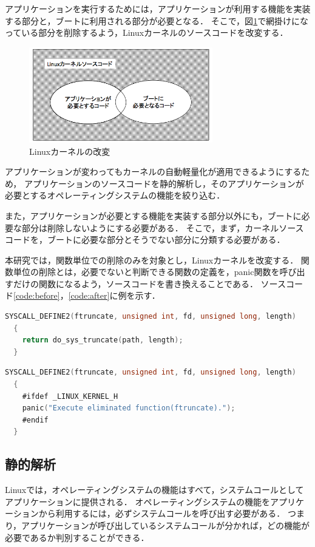 \documentclass[graduation-thesis]{mlarticle}
\begin{document}
アプリケーションを実行するためには，アプリケーションが利用する機能を実装する部分と，ブートに利用される部分が必要となる．
そこで，図\ref{fig:kernelcode}で網掛けになっている部分を削除するよう，Linuxカーネルのソースコードを改変する．

\begin{figure}[H]
  \begin{center}
    \includegraphics[width=8.0cm]{images/kernelcode.png}
    \caption{Linuxカーネルの改変}
    \label{fig:kernelcode}
  \end{center}
\end{figure}

アプリケーションが変わってもカーネルの自動軽量化が適用できるようにするため，
アプリケーションのソースコードを静的解析し，そのアプリケーションが必要とするオペレーティングシステムの機能を絞り込む．

また，アプリケーションが必要とする機能を実装する部分以外にも，ブートに必要な部分は削除しないようにする必要がある．
そこで，まず，カーネルソースコードを，ブートに必要な部分とそうでない部分に分類する必要がある．

本研究では，関数単位での削除のみを対象とし，Linuxカーネルを改変する．
関数単位の削除とは，必要でないと判断できる関数の定義を，panic関数を呼び出すだけの関数になるよう，ソースコードを書き換えることである．
ソースコード\ref{code:before}，\ref{code:after}に例を示す．

\begin{lstlisting}[language=C, caption=ftruncate関数(改変前), label=code:before]
  SYSCALL_DEFINE2(ftruncate, unsigned int, fd, unsigned long, length)
  {
    return do_sys_truncate(path, length);
  }
\end{lstlisting}
\begin{lstlisting}[language=C, caption=ftruncate関数(改変後), label=code:after]
  SYSCALL_DEFINE2(ftruncate, unsigned int, fd, unsigned long, length)
  {
    #ifdef _LINUX_KERNEL_H
    panic("Execute eliminated function(ftruncate).");
    #endif
  }
\end{lstlisting}

\subsection{静的解析}
\label{proposal:static}
Linuxでは，オペレーティングシステムの機能はすべて，システムコールとしてアプリケーションに提供される．
オペレーティングシステムの機能をアプリケーションから利用するには，必ずシステムコールを呼び出す必要がある．
つまり，アプリケーションが呼び出しているシステムコールが分かれば，どの機能が必要であるか判別することができる．
\end{document}
